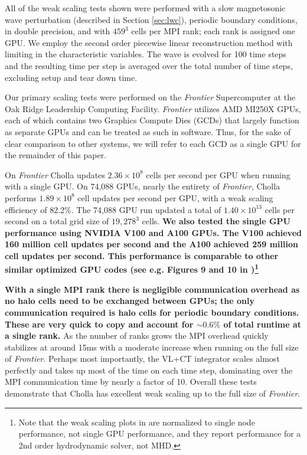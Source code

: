 \documentclass[modern, linenumbers]{aastex631}
\begin{document}
All of the weak scaling tests shown were performed with a slow magnetosonic wave perturbation (described in Section \ref{sec:lwc}), periodic boundary conditions, in double precision, and with $459^3$ cells per MPI rank; each rank is assigned one GPU. We employ the second order piecewise linear reconstruction method with limiting in the characteristic variables. The wave is evolved for 100 time steps and the resulting time per step is averaged over the total number of time steps, excluding setup and tear down time.

Our primary scaling tests were performed on the \textit{Frontier} Supercomputer at the Oak Ridge Leadership Computing Facility. \textit{Frontier} utilizes AMD MI250X GPUs, each of which contains two Graphics Compute Dies (GCDs) that largely function as separate GPUs and can be treated as such in software. Thus, for the sake of clear comparison to other systems, we will refer to each GCD as a single GPU for the remainder of this paper.

On \textit{Frontier} Cholla updates $2.36\times10^8$ cells per second per GPU when running with a single GPU. On 74,088 GPUs, nearly the entirety of \textit{Frontier}, Cholla performs $1.89\times10^8$ cell updates per second per GPU, with a weak scaling efficiency of 82.2\%. The 74,088 GPU run updated a total of $1.40\times10^{13}$ cells per second on a total grid size of $19,278^3$ cells. \textbf{We also tested the single GPU performance using NVIDIA V100 and A100 GPUs. The V100 achieved 160 million cell updates per second and the A100 achieved 259 million cell updates per second. This performance is comparable to other similar optimized GPU codes (see e.g. Figures 9 and 10 in \cite{parthenon_2023})\footnote{Note that the weak scaling plots in \cite{parthenon_2023} are normalized to single node performance, not single GPU performance, and they report performance for a 2nd order hydrodynamic solver, not MHD.}}

\textbf{With a single MPI rank there is negligible communication overhead as no halo cells need to be exchanged between GPUs; the only communication required is halo cells for periodic boundary conditions. These are very quick to copy and account for $\sim 0.6\%$ of total runtime at a single rank.} As the number of ranks grows the MPI overhead quickly stabilizes at around 15ms with a moderate increase when running on the full size of \textit{Frontier}. Perhaps most importantly, the VL+CT integrator scales almost perfectly and takes up most of the time on each time step, dominating over the MPI communication time by nearly a factor of 10. Overall these tests demonstrate that Cholla has excellent weak scaling up to the full size of \textit{Frontier}.
\end{document}
